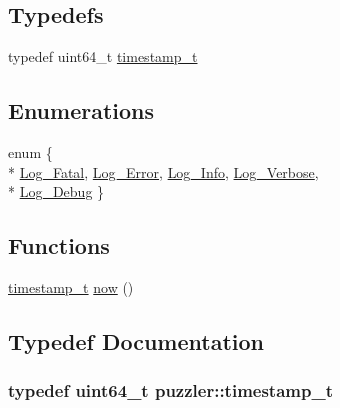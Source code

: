 \subsection*{Typedefs}
\begin{DoxyCompactItemize}
\item 
typedef uint64\+\_\+t \hyperlink{a00145_a981d458d56663fa1288f37f9c4735ee4}{timestamp\+\_\+t}
\end{DoxyCompactItemize}
\subsection*{Enumerations}
\begin{DoxyCompactItemize}
\item 
enum \{ \\*
\hyperlink{a00145_a708d6d338b0023c48ad539fa780befd4a6be2f2c64ba3c32922caf8011d9e26ef}{Log\+\_\+\+Fatal}, 
\hyperlink{a00145_a708d6d338b0023c48ad539fa780befd4aba793b246a9be54235871c8283268b5c}{Log\+\_\+\+Error}, 
\hyperlink{a00145_a708d6d338b0023c48ad539fa780befd4ab61cfe6429cf195c3090426de048b63d}{Log\+\_\+\+Info}, 
\hyperlink{a00145_a708d6d338b0023c48ad539fa780befd4a9460a6125c5f5dc355540756200a8f1c}{Log\+\_\+\+Verbose}, 
\\*
\hyperlink{a00145_a708d6d338b0023c48ad539fa780befd4ad0a133142120418b69861a205e3e1d1d}{Log\+\_\+\+Debug}
 \}
\end{DoxyCompactItemize}
\subsection*{Functions}
\begin{DoxyCompactItemize}
\item 
\hyperlink{a00145_a981d458d56663fa1288f37f9c4735ee4}{timestamp\+\_\+t} \hyperlink{a00145_ae62a97adb4ed5ad6141e879eb6505a5f}{now} ()
\end{DoxyCompactItemize}


\subsection{Typedef Documentation}
\hypertarget{a00145_a981d458d56663fa1288f37f9c4735ee4}{}
\subsubsection[{timestamp\+\_\+t}]{\setlength{\rightskip}{0pt plus 5cm}typedef uint64\+\_\+t {\bf puzzler\+::timestamp\+\_\+t}}\label{a00145_a981d458d56663fa1288f37f9c4735ee4}


